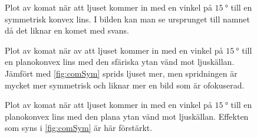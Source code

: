 \documentclass[a4paper]{article}
\begin{document}
\FloatBarrier
\begin{figure}[h]
	\centering
	
	\caption{Plot av komat när att ljuset kommer in med en vinkel på $\SI{15}{\degree}$ till en symmetrisk konvex lins. I bilden kan man se ursprunget till namnet då det liknar en komet med svans.}
	\label{fig:comSym}
\end{figure}
\begin{figure}[h]
	\centering
	
	\caption{Plot av komat när av att ljuset kommer in med en vinkel på $\SI{15}{\degree}$ till en planokonvex lins med den sfäriska ytan vänd mot ljuskällan. Jämfört med \autoref{fig:comSym} sprids ljuset mer, men spridningen är mycket mer symmetrisk och liknar mer en bild som är ofokuserad.}
	\label{fig:comP1}
\end{figure}
\begin{figure}[h]
	\centering
	
	\caption{Plot av komat när att ljuset kommer in med en vinkel på $\SI{15}{\degree}$ till en planokonvex lins med den plana ytan vänd mot ljuskällan. Effekten som syns i \autoref{fig:comSym} är här förstärkt.}
	\label{fig:comM1}
\end{figure}
\FloatBarrier
 
 {}
 
\end{document}
